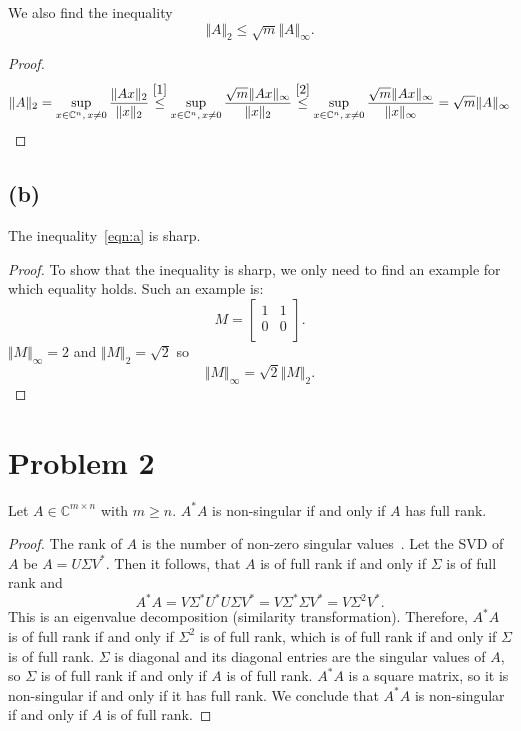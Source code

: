 \documentclass[a4paper, 11pt]{article}
\begin{document}
We also find the inequality
\begin{equation*}
  \Vert A \Vert_2 \leq \sqrt{m} \Vert A \Vert_\infty.
\end{equation*}
\begin{proof}
\begin{equation*}
  \Vert A \Vert_2 = \sup_{x \in \mathbb{C}^n,\,x \neq 0} \frac{\Vert Ax
  \Vert_2}{\Vert x \Vert_2} \stackrel{\eqref{1}}{\leq}
  \sup_{x \in \mathbb{C}^n,\,x \neq 0} \frac{\sqrt{m}\Vert Ax \Vert_\infty}{\Vert x
  \Vert_2}
  \stackrel{\eqref{2}}{\leq}
  \sup_{x \in \mathbb{C}^n,\,x \neq 0} \frac{\sqrt{m}\Vert Ax \Vert_\infty}{\Vert x
  \Vert_\infty} = \sqrt{m} \Vert A \Vert_\infty
\end{equation*}
\end{proof}

\subsection*{(b)}
The inequality~\eqref{eqn:a} is sharp.
\begin{proof}
  To show that the inequality is sharp, we only need to find an example for which equality holds. Such an example is:
  \begin{equation*}
    M =
    \begin{bmatrix}
    1 & 1 \\
    0 & 0 \\
    \end{bmatrix}.
  \end{equation*}
  $\Vert M \Vert_\infty = 2$ and $\Vert M \Vert_2 = \sqrt{2}$ so
  \begin{equation*}
    \Vert M \Vert_\infty = \sqrt{2} \Vert M \Vert_2.
  \end{equation*}
\end{proof}

\section*{Problem 2}
Let $A \in \mathbb{C}^{m \times n}$ with $m \geq  n$. $A^{*}A$ is non-singular
if and only if $A$ has full rank.
\begin{proof}
The rank of $A$ is the number of non-zero singular values~\cite[Theorem
5.1]{tb}.  Let the SVD of $A$ be $A = U\Sigma V^*$. Then it follows, that $A$
is of full rank if and only if $\Sigma$ is of full rank and
\begin{equation*}
  A^*A = V \Sigma^* U^* U \Sigma V^* = V \Sigma^* \Sigma V^* = V \Sigma^2 V^*.
\end{equation*}
This is an eigenvalue decomposition (similarity transformation). Therefore,
$A^*A$ is of full rank if and only if $\Sigma^2$ is of full rank, which is of
full rank if and only if $\Sigma$ is of full rank. $\Sigma$ is diagonal and its
diagonal entries are the singular values of $A$,  so $\Sigma$ is of full rank
if and only if $A$ is of full rank. $A^*A$ is a square matrix, so it is
non-singular if and only if it has full rank. We conclude that $A^*A$ is
non-singular if and only if $A$ is of full rank.
\end{proof}
\end{document}
